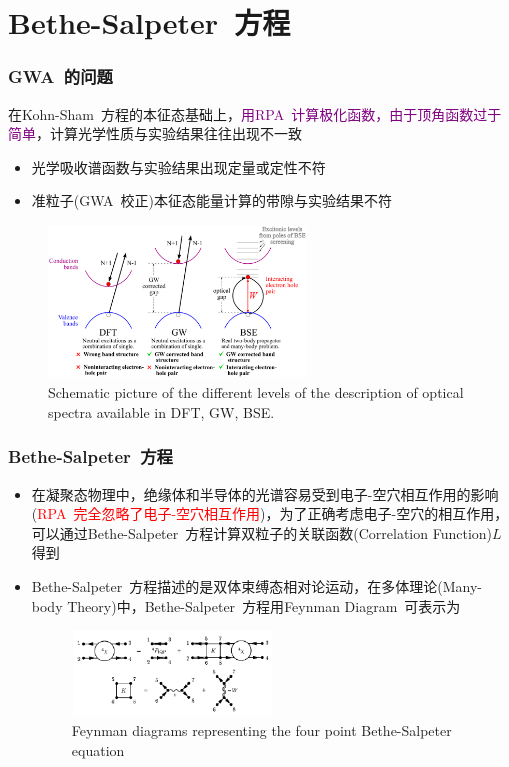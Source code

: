 \documentclass[cjk,slidestop,compress,mathserif,blue]{beamer}
\begin{document}
\section{\rm{Bethe-Salpeter~}方程}
\frame
{
	\frametitle{\textrm{GWA~}的问题}
	在\textrm{Kohn-Sham~}方程的本征态基础上，\textcolor{purple}{用\textrm{RPA~}计算极化函数，由于顶角函数过于简单}，计算光学性质与实验结果往往出现不一致
	\begin{itemize}
		\item 光学吸收谱函数与实验结果出现定量或定性不符
		\item 准粒子(\textrm{GWA~}校正)本征态能量计算的带隙与实验结果不符
	\end{itemize}
\begin{figure}[h!]
\centering
\vspace*{-0.12in}
\includegraphics[height=1.6in,width=2.7in,viewport=0 0 1000 600,clip]{Figures/BSE_GW_DFT.png}
\caption{\small \textrm{Schematic picture of the different levels of the description of optical spectra available in DFT, GW, BSE.}}%
\label{DFT_GW_BSE}
\end{figure} 
}

\frame
{
	\frametitle{\textrm{Bethe-Salpeter~}方程}
	\begin{itemize}
		\item 在凝聚态物理中，绝缘体和半导体的光谱容易受到电子-空穴相互作用的影响(\textcolor{red}{\textrm{RPA~}完全忽略了电子-空穴相互作用})，为了正确考虑电子-空穴的相互作用，可以通过\textrm{Bethe-Salpeter~}方程计算双粒子的关联函数(\textrm{Correlation Function})$L$得到
		\item \textrm{Bethe-Salpeter~}方程描述的是双体束缚态相对论运动，在多体理论(\textrm{Many-body Theory})中，\textrm{Bethe-Salpeter~}方程用\textrm{Feynman Diagram~}可表示为
\begin{figure}[h!]
\centering
\vspace*{-0.1in}
\includegraphics[height=0.9in,width=2.1in,viewport=0 0 650 280,clip]{Figures/BSE_Feynman.png}
\caption{\small \textrm{Feynman diagrams representing the four point Bethe-Salpeter equation}}%
\label{BSE_Feynman}
\end{figure} 
	\end{itemize}
}
\end{document}

